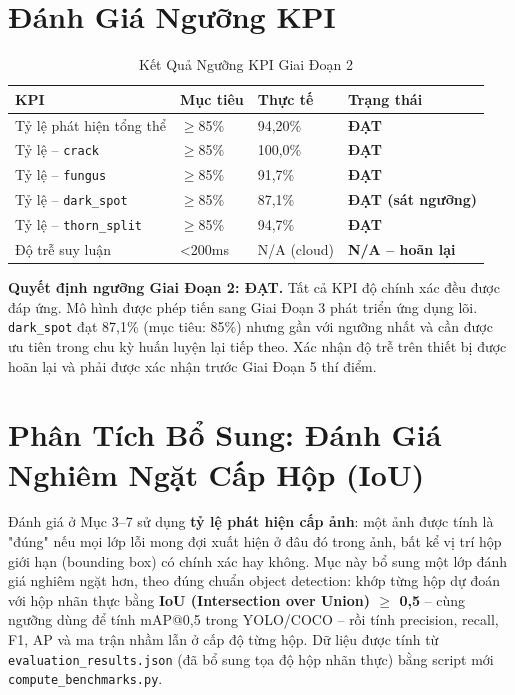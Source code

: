 \documentclass[12pt, a4paper]{article}
\newcommand{\pass}{\textcolor{success}{\textbf{ĐẠT}}}
\newcommand{\marginal}{\textcolor{warning}{\textbf{ĐẠT (sát ngưỡng)}}}
\newcommand{\notapplicable}{\textcolor{warning}{\textbf{N/A -- hoãn lại}}}
\begin{document}
\section{Đánh Giá Ngưỡng KPI}

\begin{table}[H]
  \centering
  \caption{Kết Quả Ngưỡng KPI Giai Đoạn 2}
  \begin{tabularx}{\linewidth}{L{5cm} C{2.5cm} C{2.5cm} C{3cm}}
    \toprule
    \textbf{KPI} & \textbf{Mục tiêu} & \textbf{Thực tế} & \textbf{Trạng thái} \\
    \midrule
    Tỷ lệ phát hiện tổng thể         & $\geq$85\%  & 94,20\% & \pass \\
    Tỷ lệ -- \texttt{crack}          & $\geq$85\%  & 100,0\% & \pass \\
    Tỷ lệ -- \texttt{fungus}         & $\geq$85\%  & 91,7\%  & \pass \\
    Tỷ lệ -- \texttt{dark\_spot}     & $\geq$85\%  & 87,1\%  & \marginal \\
    Tỷ lệ -- \texttt{thorn\_split}   & $\geq$85\%  & 94,7\%  & \pass \\
    Độ trễ suy luận                  & \textless{}200ms & N/A (cloud) & \notapplicable \\
    \bottomrule
  \end{tabularx}
\end{table}

\begin{tcolorbox}[kpibox]
  \textbf{Quyết định ngưỡng Giai Đoạn 2: ĐẠT.} Tất cả KPI độ chính xác đều được đáp ứng. Mô hình được phép tiến sang Giai Đoạn 3 phát triển ứng dụng lõi. \texttt{dark\_spot} đạt 87,1\% (mục tiêu: 85\%) nhưng gần với ngưỡng nhất và cần được ưu tiên trong chu kỳ huấn luyện lại tiếp theo. Xác nhận độ trễ trên thiết bị được hoãn lại và phải được xác nhận trước Giai Đoạn 5 thí điểm.
\end{tcolorbox}

\section{Phân Tích Bổ Sung: Đánh Giá Nghiêm Ngặt Cấp Hộp (IoU)}

Đánh giá ở Mục 3--7 sử dụng \textbf{tỷ lệ phát hiện cấp ảnh}: một ảnh được tính là "đúng" nếu mọi lớp lỗi mong đợi xuất hiện ở đâu đó trong ảnh, bất kể vị trí hộp giới hạn (bounding box) có chính xác hay không. Mục này bổ sung một lớp đánh giá nghiêm ngặt hơn, theo đúng chuẩn object detection: khớp từng hộp dự đoán với hộp nhãn thực bằng \textbf{IoU (Intersection over Union) $\geq$ 0,5} -- cùng ngưỡng dùng để tính mAP@0,5 trong YOLO/COCO -- rồi tính precision, recall, F1, AP và ma trận nhầm lẫn ở cấp độ từng hộp. Dữ liệu được tính từ \texttt{evaluation\_results.json} (đã bổ sung tọa độ hộp nhãn thực) bằng script mới \texttt{compute\_benchmarks.py}.
\end{document}
